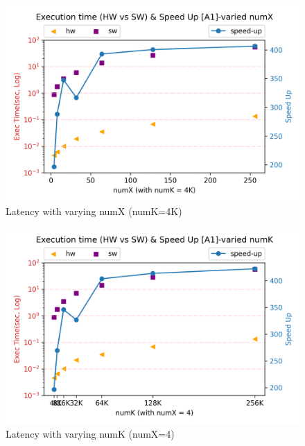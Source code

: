 \begin{figure}[h!]
    \centering
    \includegraphics[width=\columnwidth]{figure/a1-vary-x.png}
    \caption{Latency with varying numX (numK=4K)}
    \label{fig-a1-x}
\end{figure}

\begin{figure}[h!]
    \centering
    \includegraphics[width=\columnwidth]{figure/a1-vary-k.png}
    \caption{Latency with varying numK (numX=4)}
    \label{fig-a1-k}
\end{figure}
